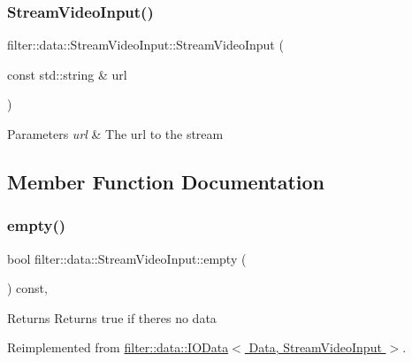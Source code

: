 \subsubsection{\texorpdfstring{Stream\+Video\+Input()}{StreamVideoInput()}}
{\footnotesize\ttfamily filter\+::data\+::\+Stream\+Video\+Input\+::\+Stream\+Video\+Input (\begin{DoxyParamCaption}\item[{const std\+::string \&}]{url }\end{DoxyParamCaption})}


\begin{DoxyParams}{Parameters}
{\em url} & The url to the stream \\
\hline
\end{DoxyParams}


\subsection{Member Function Documentation}
\mbox{\label{classfilter_1_1data_1_1_stream_video_input_ab0b4745731df53d3be6dfed959be5b7b}} 
\subsubsection{\texorpdfstring{empty()}{empty()}}
{\footnotesize\ttfamily bool filter\+::data\+::\+Stream\+Video\+Input\+::empty (\begin{DoxyParamCaption}{ }\end{DoxyParamCaption}) const\hspace{0.3cm}{\ttfamily [inline]}, {\ttfamily [virtual]}}

\begin{DoxyReturn}{Returns}
Returns true if there\textquotesingle{}s no data 
\end{DoxyReturn}


Reimplemented from \hyperlink{classfilter_1_1data_1_1_i_o_data}{filter\+::data\+::\+I\+O\+Data$<$ Data, Stream\+Video\+Input $>$}.

\mbox{\label{classfilter_1_1data_1_1_stream_video_input_af2a6fc1d8d1f809684e11d156dfc8e7d}} 
